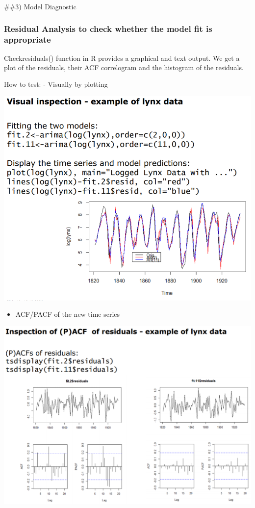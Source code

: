 \documentclass[
]{article}
\providecommand{\tightlist}{%
  \setlength{\itemsep}{0pt}\setlength{\parskip}{0pt}}
\begin{document}
\#\#3) Model Diagnostic

\hypertarget{residual-analysis-to-check-whether-the-model-fit-is-appropriate}{%
\subsubsection{Residual Analysis to check whether the model fit is
appropriate}\label{residual-analysis-to-check-whether-the-model-fit-is-appropriate}}

Checkresiduals() function in R provides a graphical and text output. We
get a plot of the residuals, their ACF correlogram and the histogram of
the residuals.

How to test: - Visually by plotting

\includegraphics[width=1\linewidth]{visu}

\begin{itemize}
\tightlist
\item
  ACF/PACF of the new time series
\end{itemize}

\includegraphics[width=1\linewidth]{visu2}
\end{document}
